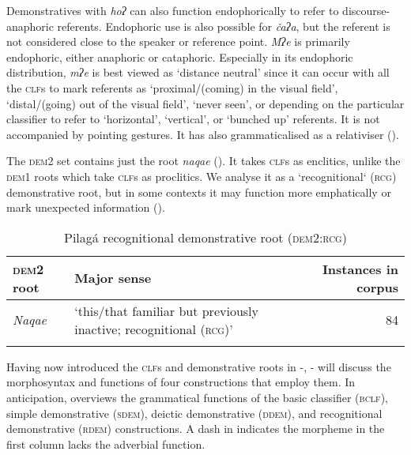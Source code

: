 \documentclass[output=paper,colorlinks,citecolor=brown]{langscibook}
\begin{document}
Demonstratives with \textit{hoʔ} can also function endophorically to refer to discourse-anaphoric referents. Endophoric use is also possible for \textit{čaʔa}, but the referent is not considered close to the speaker or reference point. \textit{Mʔe} is primarily endophoric, either anaphoric or cataphoric. Especially in its endophoric distribution, \textit{mʔe} is best viewed as ‘distance neutral’ \citep[211]{Himmelmann1996} since it can occur with all the \textsc{clf}s to mark referents as ‘proximal/(coming) in the visual field’, ‘distal/(going) out of the visual field’, ‘never seen’, or depending on the particular classifier to refer to ‘horizontal’, ‘vertical’, or ‘bunched up’ referents. It is not accompanied by pointing gestures. It has also grammaticalised as a relativiser ().

The \textsc{dem2} set contains just the root \textit{naqae} (). It takes \textsc{clf}s as enclitics, unlike the \textsc{dem1} roots which take \textsc{clf}s as proclitics. We analyse it as a ‘recognitional‘ (\textsc{rcg}) demonstrative root, but in some contexts it may function more emphatically or mark unexpected information ().

\begin{table}
\begin{tabularx}{\textwidth}{lQr}
\lsptoprule
{\bfseries \textsc{dem2} root} & {\bfseries Major sense} & {\bfseries Instances in corpus}\\
\midrule
{\textit{Naqae}} & {‘this/that familiar but previously inactive; recognitional (\textsc{rcg})’} & 84\\
\lspbottomrule
\end{tabularx}
\caption{Pilagá recognitional demonstrative root (\textsc{dem2:rcg})}
\label{tab:payne:3}
\end{table}

Having now introduced the \textsc{clf}s and demonstrative roots in -, - will discuss the morphosyntax and functions of four constructions that employ them. In anticipation,  overviews the grammatical functions of the basic classifier (\textsc{bclf}), simple demonstrative (\textsc{sdem}), deictic demonstrative (\textsc{ddem}), and recognitional demonstrative (\textsc{rdem}) constructions. A dash in  indicates the morpheme in the first column lacks the adverbial function.
\end{document}
